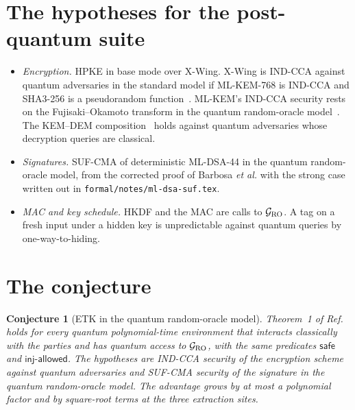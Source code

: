 \documentclass[aps,prx,reprint,superscriptaddress,nofootinbib,floatfix]{revtex4-2}
\newtheorem{conjecture}{Conjecture}
\theoremstyle{remark}
\newcommand{\GRO}{\mathcal G_{\rm RO}}
\begin{document}
\section{The hypotheses for the post-quantum suite}

\begin{itemize}
\item \emph{Encryption.} HPKE in base mode over X-Wing. X-Wing is IND-CCA against quantum adversaries in the standard model if ML-KEM-768 is IND-CCA and SHA3-256 is a pseudorandom function~\cite{xwing}. ML-KEM's IND-CCA security rests on the Fujisaki--Okamoto transform in the quantum random-oracle model~\cite{hhk,fips203}. The KEM--DEM composition~\cite{cramer-shoup} holds against quantum adversaries whose decryption queries are classical.
\item \emph{Signatures.} SUF-CMA of deterministic ML-DSA-44 in the quantum random-oracle model, from the corrected proof of Barbosa \emph{et al.} with the strong case written out in \texttt{formal/notes/ml-dsa-suf.tex}.
\item \emph{MAC and key schedule.} HKDF and the MAC are calls to $\GRO$. A tag on a fresh input under a hidden key is unpredictable against quantum queries by one-way-to-hiding.
\end{itemize}

\section{The conjecture}

\begin{conjecture}[ETK in the quantum random-oracle model]\label{conj}
Theorem~1 of Ref.~\cite{etk} holds for every quantum polynomial-time environment that interacts classically with the parties and has quantum access to $\GRO$, with the same predicates $\mathsf{safe}$ and $\mathsf{inj\text{-}allowed}$. The hypotheses are IND-CCA security of the encryption scheme against quantum adversaries and SUF-CMA security of the signature in the quantum random-oracle model. The advantage grows by at most a polynomial factor and by square-root terms at the three extraction sites.
\end{conjecture}
\end{document}
